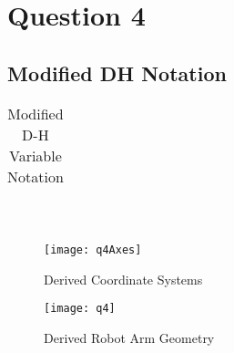\newpage
\section{Question 4}
	\subsection{Modified DH Notation}
	\noindent
	\begin{table}[position = here]
		\begin{centering}
			\begin{tabular}{||l|l|l|l|l||}
			
			\end{tabular}\\
		\end{centering}
		\begin{flushleft}
			\caption [DHVariables] {Modified D-H Variable Notation}
		\end{flushleft}
	\end{table}
	
		\begin{figure}[position = here]
			\begin{centering}
				\texttt{[image: q4Axes]}\\
				\caption [DHDrawing]{Derived Coordinate Systems}
			\end{centering}
		\end{figure}
		
		\begin{figure}[position = here]
			\begin{centering}
				\texttt{[image: q4]}\\
				\caption [DHDrawing]{Derived Robot Arm Geometry}
			\end{centering}
		\end{figure}